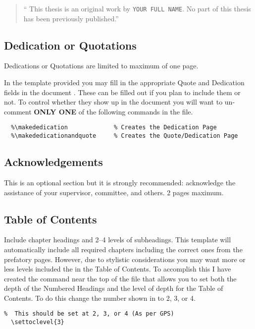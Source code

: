 				\begin{quote}
					\enquote{
						This thesis is an original work by \texttt{YOUR FULL NAME}. 
						No part of this thesis has been previously published.}
				\end{quote}

		\subsection{Dedication or Quotations}\label{quote}\label{dedication}
			Dedications or Quotations are limited to maximum of one page.
			
			In the template provided you may fill in the appropriate Quote and Dedication fields in the document .
			These can be filled out if you plan to include them or not.
			To control whether they show up in the document you will want to un-comment \textbf{ONLY ONE} of the following commands in the  file.

			\begin{lstlisting}[float=ht,caption=Quote and Dedication Inclusion Options (un-comment only one),label=lst:QuotesAndDedication,style=LaTeXStyle,basicstyle=\scriptsize\ttfamily,]
  %\makequote                  % Creates the Quote Page
  %\makededication             % Creates the Dedication Page
  %\makededicationandquote     % Creates the Quote/Dedication Page
			\end{lstlisting}

		\subsection{Acknowledgements}\label{acknowledgement}
			This is an optional section but it is strongly recommended: acknowledge the assistance of your supervisor, committee, and others. 2 pages maximum. 

		\subsection{Table of Contents}\label{toc}
			Include chapter headings and 2--4 levels of subheadings. 
			This template will automatically include all required chapters including the correct ones from the prefatory pages.
			However, due to stylistic considerations you may want more or less levels included the in the Table of Contents.
			To accomplish this I have created the command near the top of the  file that allows you to set both the depth of the Numbered Headings and the level of depth for the Table of Contents.
			To do this change the number shown in  to 2, 3, or 4.
			\begin{lstlisting}[float=ht,caption=Set Numbered Heading and ToC Level,label=lst:tocLevels,style=LaTeXStyle,basicstyle=\scriptsize\ttfamily,]
% Option to change the Level of subheading included in the Table of Contents
%  This should be set at 2, 3, or 4 (As per GPS)
  \settoclevel{3}
			\end{lstlisting}

